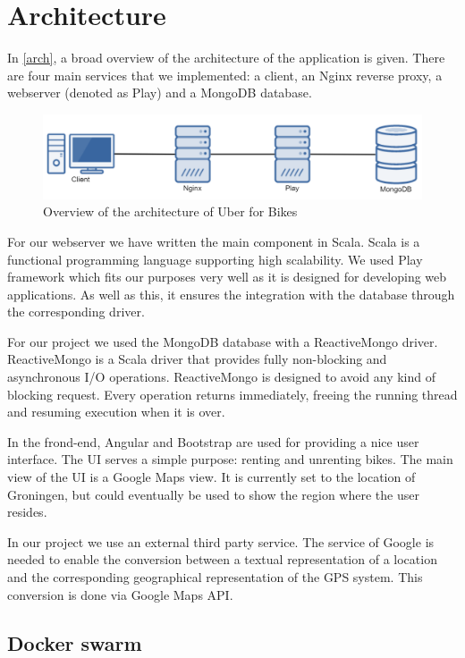 \section{Architecture}

In \autoref{arch}, a broad overview of the architecture of the application is given. There are four main services that we implemented: a client, an Nginx reverse proxy, a webserver (denoted as Play) and a MongoDB database.

    \begin{figure}[H]
		\centering
		\includegraphics[width=1.0\textwidth]{images/Architecture.png}
		\caption{Overview of the architecture of Uber for Bikes}
		\label{arch}
	\end{figure}

For our webserver we have written the main component in Scala. Scala is a functional programming language supporting high scalability. We used Play framework which fits our purposes very well as it is designed for developing web applications.  As well as this, it ensures the integration with the database through the corresponding driver.

For our project we used the MongoDB database with a ReactiveMongo driver. ReactiveMongo is a Scala driver that provides fully non-blocking and asynchronous I/O operations. ReactiveMongo is designed to avoid any kind of blocking request. Every operation returns immediately, freeing the running thread and resuming execution when it is over.

In the frond-end, Angular and Bootstrap are used for providing a nice user interface. The UI serves a simple purpose: renting and unrenting bikes. The main view of the UI is a Google Maps view. It is currently set to the location of Groningen, but could eventually be used to show the region where the user resides.

In our project we use an external third party service. The service of Google is needed to enable the conversion between a textual representation of a location and the corresponding geographical representation of the GPS system. This conversion is done via Google Maps API.

\subsection{Docker swarm}


